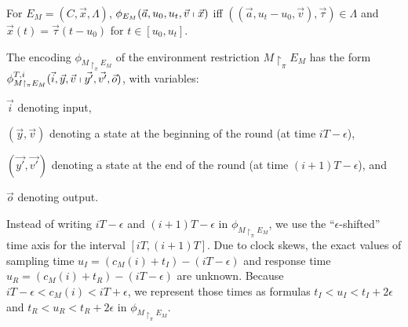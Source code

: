\begin{definition}
For %
$E_M = (C, \vec{x}, \Lambda)$,
$\phi_{E_M}(\vec{a},u_0,u_t,\vec{v} \shortmid \vec{x})$
iff
$((\vec{a},u_t-u_0,\vec{v}), \vec{\tau}) \in \Lambda$
and $\vec{x}(t) = \vec{\tau}(t - u_0)$ for $t \in [u_0, u_t]$.
\end{definition}

The encoding $\phi_{M \restriction_\pi E_M}$ of the 
 environment restriction $M \restriction_\pi E_M$
has the form
$\phi_{M \restriction_\pi E_M}^{T,i}(\vec{i}, \vec{y}, \vec{v} \shortmid \vec{y'}, \vec{v'}, \vec{o})$,
with variables:
\begin{inparaenum}[(i)]
	\item $\vec{i}$ denoting input, 
	\item $(\vec{y},\vec{v})$ denoting a state  at the beginning of the round 
		(at time $iT - \epsilon$),
	\item $(\vec{y'},\vec{v'})$ denoting a state at the end of the round 
		(at time $(i+1)T - \epsilon$), and 
	\item $\vec{o}$ denoting output.
\end{inparaenum}
%
Instead of  writing $iT - \epsilon$ and $(i+1)T - \epsilon$  in $\phi_{M \restriction_\pi E_M}$,
we use the ``$\epsilon$-shifted''  time axis for the interval $[iT, (i+1)T]$. %
%
Due to clock skews, 
the exact values of sampling time $u_I = (c_M(i)+t_I)-(iT-\epsilon)$
and response time $u_R = (c_M(i)+t_R)-(iT-\epsilon)$ are unknown. 
Because $iT - \epsilon < c_M(i) < iT + \epsilon$,
we represent those times as formulas 
$t_I < u_I < t_I + 2\epsilon$ and $t_R < u_R < t_R + 2\epsilon$
in $\phi_{M \restriction_\pi E_M}$.






